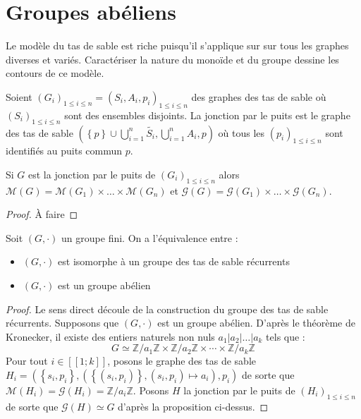 
\section{Groupes abéliens}

Le modèle du tas de sable est riche puisqu'il s'applique sur sur tous les
graphes diverses et variés. Caractériser la nature du monoïde et du groupe
dessine les contours de ce modèle.

\begin{definition}
Soient $\left(G_i\right)_{1 \leqslant i \leqslant n} =
\left(S_i, A_i, p_i\right)_{1 \leqslant i \leqslant n}$ des graphes des tas de
sable où $\left(S_i\right)_{1 \leqslant i \leqslant n}$ sont des ensembles
disjoints.
La jonction par le puits est le graphe des tas de sable
$(\left\{p\right\} \cup \bigcup_{i=1}^{n} \widetilde{S_i},
\bigcup_{i=1}^{n} A_i, p)$ où tous les $\left(p_i\right)_
{1 \leqslant i \leqslant n}$ sont identifiés au puits commun $p$.
\end{definition}

\begin{proposition}
Si $G$ est la jonction par le puits de $\left(G_i\right)
_{1 \leqslant i \leqslant n}$ alors $\mathcal{M}\left(G\right)
= \mathcal{M}\left(G_1\right) \times \ldots \times \mathcal{M}\left(G_n\right)$
et $\mathcal{G}\left(G\right)
= \mathcal{G}\left(G_1\right) \times \ldots \times \mathcal{G}\left(G_n\right)$.
\end{proposition}

\begin{proof}
À faire
\end{proof}

\begin{theoreme}
Soit $(G, \cdot)$ un groupe fini.
On a l'équivalence entre :
\begin{itemize}[label=\textbullet]
    \item $(G, \cdot)$ est isomorphe à un groupe des tas de sable récurrents
    \item $(G, \cdot)$ est un groupe abélien
\end{itemize}
\end{theoreme}

\begin{proof}
Le sens direct découle de la construction du groupe des tas de sable récurrents.
Supposons que $(G, \cdot)$ est un groupe abélien.
D'après le théorème de Kronecker, il existe des entiers naturels non nuls
$a_1 | a_2 | \ldots | a_k$ tels que :
$$
G \simeq \mathbb {Z} / a_1 \mathbb{Z} \times \mathbb{Z} / a_2 \mathbb{Z} \times \cdots \times \mathbb{Z} / a_k \mathbb{Z}
$$
Pour tout $i \in [\![1;k]\!]$, posons le graphe des tas de sable $H_i =
\left( \left\{s_i, p_i\right\}, \left(\left\{\left(s_i, p_i\right)\right\},
\left(s_i, p_i\right) \mapsto a_i\right), p_i \right)$
de sorte que $\mathcal{M}\left(H_i\right) = \mathcal{G}\left(H_i\right) =
\mathbb{Z} / a_i \mathbb{Z}$.
Posons $H$ la jonction par le puits de $\left(H_i\right)_
{1 \leqslant i \leqslant n}$ de sorte que $\mathcal{G}(H) \simeq G$ d'après la
proposition ci-dessus.
\end{proof}

